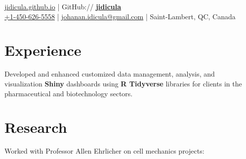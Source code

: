 \documentclass[]{jidicula-resume}
\begin{document}
% 
% 
\lastupdated



{ \href{http://bit.ly/jidicula_site}{jidicula.github.io}
  | GitHub:// \href{http://bit.ly/jidicula_github}{\bf jidicula} \\
  \href{tel:14506265558}{+1-450-626-5558}
  | \href{mailto:johanan.idicula+resume@gmail.com}{johanan.idicula@gmail.com}
  | Saint-Lambert, QC, Canada}

\section{Experience}

\vspace{\topsep} %
\begin{tightemize}
\item Developed and enhanced customized data management, analysis, and
  visualization \textbf{Shiny} dashboards using \textbf{R Tidyverse} libraries
  for clients in the pharmaceutical and biotechnology sectors.
\end{tightemize}
\sectionsep

\section{Research}
Worked with Professor Allen Ehrlicher on cell mechanics projects:
\end{document}
